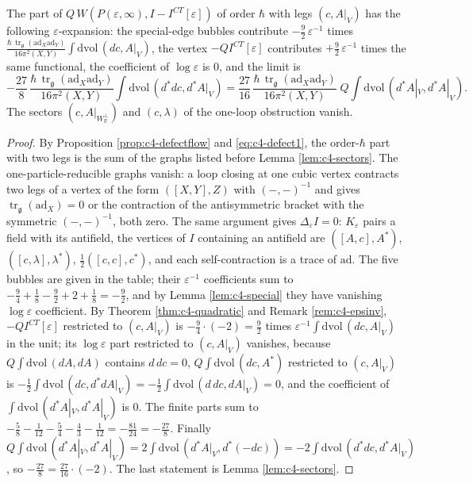 \begin{theorem}
\label{thm:c4-obstruction}
The part of $Q\,W(P(\varepsilon,\infty),I-I^{CT}[\varepsilon])$ of order $\hbar$ with legs $(c,A|_V)$ has the following $\varepsilon$-expansion: the special-edge bubbles contribute $-\tfrac92\,\varepsilon^{-1}$ times $\frac{\hbar\,\operatorname{tr}_{\mathfrak g}(\mathrm{ad}_X\mathrm{ad}_Y)}{16\pi^2(X,Y)}\int\mathrm{dvol}\,(dc,A|_V)$, the vertex $-QI^{CT}[\varepsilon]$ contributes $+\tfrac92\,\varepsilon^{-1}$ times the same functional, the coefficient of $\log\varepsilon$ is $0$, and the limit is
\begin{equation}
-\frac{27}{8}\,\frac{\hbar\,\operatorname{tr}_{\mathfrak g}(\mathrm{ad}_X\mathrm{ad}_Y)}{16\pi^2(X,Y)}\int\mathrm{dvol}\,(d^*dc,d^*A|_V)=\frac{27}{16}\,\frac{\hbar\,\operatorname{tr}_{\mathfrak g}(\mathrm{ad}_X\mathrm{ad}_Y)}{16\pi^2(X,Y)}\;Q\int\mathrm{dvol}\,(d^*A|_V,d^*A|_V).
\label{eq:c4-obstruction}
\end{equation}
The sectors $(c,A|_{W_{\mathbb R}^\perp})$ and $(c,\lambda)$ of the one-loop obstruction vanish.
\end{theorem}

\begin{proof}
By Proposition \ref{prop:c4-defectflow} and \eqref{eq:c4-defect1}, the order-$\hbar$ part with two legs is the sum of the graphs listed before Lemma \ref{lem:c4-sectors}. The one-particle-reducible graphs vanish: a loop closing at one cubic vertex contracts two legs of a vertex of the form $([X,Y],Z)$ with $(-,-)^{-1}$ and gives $\operatorname{tr}_{\mathfrak g}(\mathrm{ad}_X)=0$ or the contraction of the antisymmetric bracket with the symmetric $(-,-)^{-1}$, both zero. The same argument gives $\Delta_\varepsilon I=0$: $K_\varepsilon$ pairs a field with its antifield, the vertices of $I$ containing an antifield are $([A,c],A^*)$, $([c,\lambda],\lambda^*)$, $\tfrac12([c,c],c^*)$, and each self-contraction is a trace of $\mathrm{ad}$. The five bubbles are given in the table; their $\varepsilon^{-1}$ coefficients sum to $-\tfrac94+\tfrac18-\tfrac92+2+\tfrac18=-\tfrac92$, and by Lemma \ref{lem:c4-special} they have vanishing $\log\varepsilon$ coefficient. By Theorem \ref{thm:c4-quadratic} and Remark \ref{rem:c4-epsinv}, $-QI^{CT}[\varepsilon]$ restricted to $(c,A|_V)$ is $-\tfrac94\cdot(-2)=\tfrac92$ times $\varepsilon^{-1}\int\mathrm{dvol}\,(dc,A|_V)$ in the unit; its $\log\varepsilon$ part restricted to $(c,A|_V)$ vanishes, because $Q\int\mathrm{dvol}\,(dA,dA)$ contains $d\,dc=0$, $Q\int\mathrm{dvol}\,(dc,A^*)$ restricted to $(c,A|_V)$ is $-\tfrac12\int\mathrm{dvol}\,(dc,d^*dA|_V)=-\tfrac12\int\mathrm{dvol}\,(d\,dc,dA|_V)=0$, and the coefficient of $\int\mathrm{dvol}\,(d^*A|_V,d^*A|_V)$ is $0$. The finite parts sum to $-\tfrac58-\tfrac1{12}-\tfrac54-\tfrac43-\tfrac1{12}=-\tfrac{81}{24}=-\tfrac{27}8$. Finally $Q\int\mathrm{dvol}\,(d^*A|_V,d^*A|_V)=2\int\mathrm{dvol}\,(d^*A|_V,d^*(-dc))=-2\int\mathrm{dvol}\,(d^*dc,d^*A|_V)$, so $-\tfrac{27}8=\tfrac{27}{16}\cdot(-2)$. The last statement is Lemma \ref{lem:c4-sectors}.
\end{proof}

